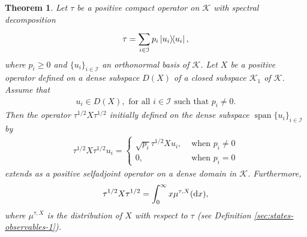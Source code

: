 \documentclass[12pt,a4paper,oneside]{article}
\numberwithin{equation}{section}
\theoremstyle{definition}  %
\theoremstyle{plain}  %
\newtheorem{thm}[defn]{Theorem}
\theoremstyle{remark} %
\newcommand{\CK}{\mathcal{K}}
\let\tr\relax
\DeclareMathOperator{\tr}{Tr}
\DeclareMathOperator{\spn}{span}
\begin{document}
\begin{thm}\label{sec:gaussian-states-prop}
   Let $\tau$ be a
  positive compact operator on $\CK$ with spectral decomposition 
\begin{align*}
\tau = \sum\limits_{i\in\mathcal{I}}^{}p_i\ketbra{u_i},
\end{align*} where $p_i\geq 0$ and $\{u_i\}_{i\in\mathcal{I}}$ an orthonormal basis of
$\CK$. Let $X$ be a positive operator defined on a dense subspace $D(X)$ of a closed subspace $\mathcal{K}_1$ of $\mathcal{K}$. 
Assume that  \begin{align}\label{item:8}
    u_i\in D(X), \text{ for all } i\in \mathcal{I} \text{ such that } p_i\neq 0.
\end{align}Then the operator $\tau^{1/2}X\tau^{1/2}$ initially defined on the dense subspace $\spn\{u_i\}_{i\in \mathcal{I}}$ by \begin{align*}
   \tau^{1/2}X\tau^{1/2}u_i= \begin{cases}
     \sqrt{p_i} \tau^{1/2}Xu_i,  &  \text{ when } p_i\neq 0\\
     0, &\text{ when } p_i = 0
      \end{cases}
\end{align*} extends as a  positive selfadjoint operator on a dense domain in  $\CK$. Furthermore,
\begin{align}
    \label{item:7} \tr \tau^{1/2}X\tau^{1/2} = \int_{0}^{\infty}x \mu^{\tau,X}(\dd x),
\end{align}
where $\mu^{\tau,X}$ is the distribution of $X$ with respect to $\tau$ (see Definition \ref{sec:states-observables-1}).
\end{thm}
\end{document}
